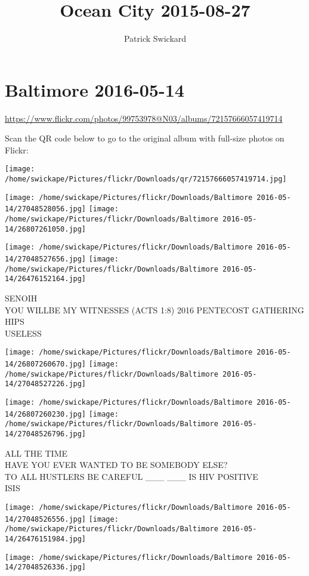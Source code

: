 \documentclass[10pt,letterpaper]{article}
\title{Ocean City 2015-08-27}
\author{Patrick Swickard}
\date{}
\begin{document}
\section*{Baltimore 2016-05-14}

\url{https://www.flickr.com/photos/99753978@N03/albums/72157666057419714}

Scan the QR code below to go to the original album with full-size photos on Flickr:

\texttt{[image: /home/swickape/Pictures/flickr/Downloads/qr/72157666057419714.jpg]}
\pagebreak

\texttt{[image: /home/swickape/Pictures/flickr/Downloads/Baltimore 2016-05-14/27048528056.jpg]}
\texttt{[image: /home/swickape/Pictures/flickr/Downloads/Baltimore 2016-05-14/26807261050.jpg]}

\texttt{[image: /home/swickape/Pictures/flickr/Downloads/Baltimore 2016-05-14/27048527656.jpg]}
\texttt{[image: /home/swickape/Pictures/flickr/Downloads/Baltimore 2016-05-14/26476152164.jpg]}

SENOIH\\
YOU WILLBE MY WITNESSES (ACTS 1:8) 2016 PENTECOST GATHERING\\
HIPS\\
USELESS
\pagebreak

\texttt{[image: /home/swickape/Pictures/flickr/Downloads/Baltimore 2016-05-14/26807260670.jpg]}
\texttt{[image: /home/swickape/Pictures/flickr/Downloads/Baltimore 2016-05-14/27048527226.jpg]}

\texttt{[image: /home/swickape/Pictures/flickr/Downloads/Baltimore 2016-05-14/26807260230.jpg]}
\texttt{[image: /home/swickape/Pictures/flickr/Downloads/Baltimore 2016-05-14/27048526796.jpg]}

ALL THE TIME\\
HAVE YOU EVER WANTED TO BE SOMEBODY ELSE?\\
TO ALL HUSTLERS BE CAREFUL \_\_\_ \_\_\_ IS HIV POSITIVE\\
ISIS
\pagebreak

\texttt{[image: /home/swickape/Pictures/flickr/Downloads/Baltimore 2016-05-14/27048526556.jpg]}
\texttt{[image: /home/swickape/Pictures/flickr/Downloads/Baltimore 2016-05-14/26476151984.jpg]}

\texttt{[image: /home/swickape/Pictures/flickr/Downloads/Baltimore 2016-05-14/27048526336.jpg]}
\end{document}

